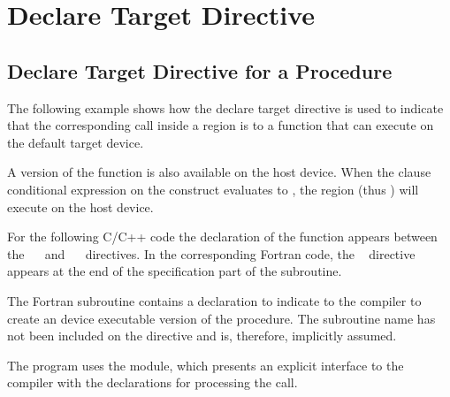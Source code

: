 \pagebreak
\section{Declare Target Directive}
\label{sec:declare_target}


\subsection{Declare Target Directive for a Procedure}

\label{subsec:declare_target_function}



The following example shows how the declare target directive 
is used to indicate that the corresponding call inside a  region 
is to a  function that can execute on the default target device.

A version of the function is also available on the host device. When the  
clause conditional expression on the  construct evaluates to , 
the  region (thus ) will execute on the host device.

For the following C/C++ code the declaration of the function  appears between the 
~~ and ~~ directives. 
In the corresponding Fortran code, the ~ directive appears at the
end of the specification part of the subroutine.


The Fortran  subroutine contains a   declaration 
to indicate to the compiler to create an device executable version of the procedure. 
The subroutine name has not been included on the   
directive and is, therefore, implicitly assumed.

The program uses the  module, which presents an explicit interface to 
the compiler with the   declarations for processing 
the  call.

